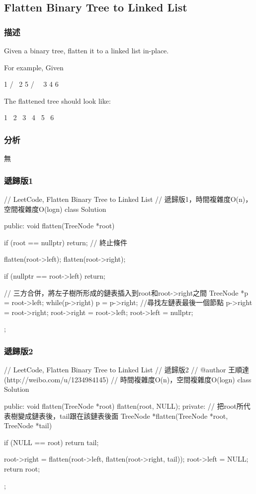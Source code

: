 \subsection{Flatten Binary Tree to Linked List}
\label{sec:flatten-binary-tree-to-linked-list}


\subsubsection{描述}
Given a binary tree, flatten it to a linked list in-place.

For example, Given
\begin{Code}
         1
        / \
       2   5
      / \   \
     3   4   6
\end{Code}

The flattened tree should look like:
\begin{Code}
   1
    \
     2
      \
       3
        \
         4
          \
           5
            \
             6
\end{Code}

\subsubsection{分析}
無


\subsubsection{遞歸版1}
\begin{Code}
// LeetCode, Flatten Binary Tree to Linked List
// 遞歸版1，時間複雜度O(n)，空間複雜度O(logn)
class Solution {
public:
    void flatten(TreeNode *root) {
        if (root == nullptr) return;  // 終止條件

        flatten(root->left);
        flatten(root->right);

        if (nullptr == root->left) return;

        // 三方合併，將左子樹所形成的鏈表插入到root和root->right之間
        TreeNode *p = root->left;
        while(p->right) p = p->right; //尋找左鏈表最後一個節點
        p->right = root->right;
        root->right = root->left;
        root->left = nullptr;
    }
};
\end{Code}


\subsubsection{遞歸版2}
\begin{Code}
// LeetCode, Flatten Binary Tree to Linked List
// 遞歸版2
// @author 王順達(http://weibo.com/u/1234984145)
// 時間複雜度O(n)，空間複雜度O(logn)
class Solution {
public:
    void flatten(TreeNode *root) {
        flatten(root, NULL);
    }
private:
    // 把root所代表樹變成鏈表後，tail跟在該鏈表後面
    TreeNode *flatten(TreeNode *root, TreeNode *tail) {
        if (NULL == root) return tail;

        root->right = flatten(root->left, flatten(root->right, tail));
        root->left = NULL;
        return root;
    }
};
\end{Code}


